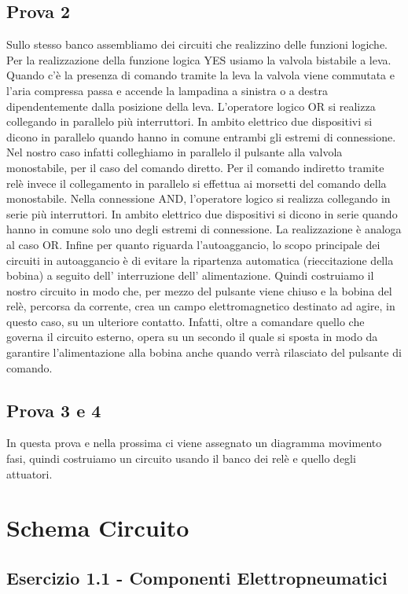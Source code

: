 \documentclass[a4paper]{article}
\begin{document}
\subsection{Prova 2}
Sullo stesso banco assembliamo dei circuiti che realizzino delle funzioni logiche. Per la realizzazione della funzione logica YES usiamo la valvola bistabile a leva. Quando c’è la presenza di comando tramite la leva la valvola viene commutata e l’aria compressa passa e accende la lampadina a sinistra o a destra dipendentemente dalla posizione della leva.
L'operatore logico OR si realizza collegando in parallelo più interruttori. In ambito elettrico due dispositivi si dicono in parallelo quando hanno in comune entrambi gli estremi di connessione. Nel nostro caso infatti colleghiamo in parallelo il pulsante alla valvola monostabile, per il caso del comando diretto. Per il comando indiretto tramite relè invece il collegamento in parallelo si effettua ai morsetti del comando della monostabile.
Nella connessione AND, l’operatore logico si realizza collegando in serie più interruttori. In ambito elettrico due dispositivi si dicono in serie quando hanno in comune solo uno degli estremi di connessione. La realizzazione è analoga al caso OR.
Infine per quanto riguarda l’autoaggancio, lo scopo principale dei circuiti in autoaggancio è di evitare la ripartenza automatica (rieccitazione della bobina) a seguito dell' interruzione dell' alimentazione. Quindi costruiamo il nostro circuito in modo che, per mezzo del pulsante viene chiuso e la bobina del relè, percorsa da corrente, crea un campo elettromagnetico destinato ad agire, in questo caso, su un ulteriore contatto. Infatti, oltre a comandare quello che governa il circuito esterno, opera su un secondo il quale si sposta in modo da garantire l'alimentazione alla bobina anche quando verrà rilasciato del pulsante di comando.

\subsection{Prova 3 e 4}
In questa prova e nella prossima ci viene assegnato un diagramma movimento fasi, quindi costruiamo un circuito usando il banco dei relè e quello degli attuatori.

\section{Schema Circuito}

\subsection{Esercizio 1.1 - Componenti Elettropneumatici}
\end{document}
